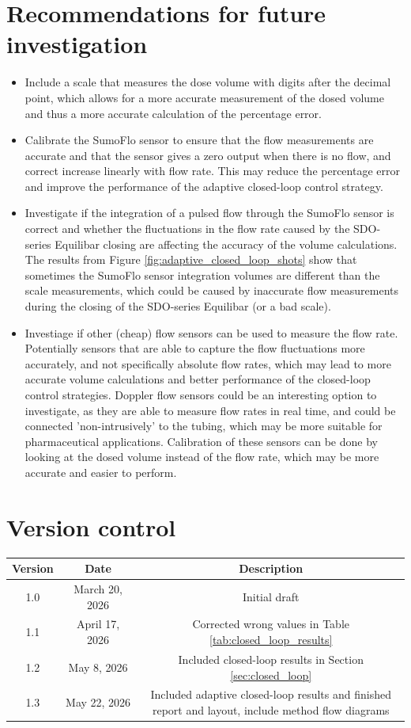 \documentclass[12pt,a4paper]{article}
\begin{document}
\section{Recommendations for future investigation}
\label{sec:recommendations}
\begin{itemize}
    \item Include a scale that measures the dose volume with digits after the decimal point, which allows for a more accurate measurement of the dosed volume and thus a more accurate calculation of the percentage error.
    \item Calibrate the SumoFlo sensor to ensure that the flow measurements are accurate and that the sensor gives a zero output when there is no flow, and correct increase linearly with flow rate. This may reduce the percentage error and improve the performance of the adaptive closed-loop control strategy.
    \item Investigate if the integration of a pulsed flow through the SumoFlo sensor is correct and whether the fluctuations in the flow rate caused by the SDO-series Equilibar closing are affecting the accuracy of the volume calculations. The results from Figure \ref{fig:adaptive_closed_loop_shots} show that sometimes the SumoFlo sensor integration volumes are different than the scale measurements, which could be caused by inaccurate flow measurements during the closing of the SDO-series Equilibar (or a bad scale).
    \item Investiage if other (cheap) flow sensors can be used to measure the flow rate. Potentially sensors that are able to capture the flow fluctuations more accurately, and not specifically absolute flow rates, which may lead to more accurate volume calculations and better performance of the closed-loop control strategies. Doppler flow sensors could be an interesting option to investigate, as they are able to measure flow rates in real time, and could be connected 'non-intrusively' to the tubing, which may be more suitable for pharmaceutical applications. Calibration of these sensors can be done by looking at the dosed volume instead of the flow rate, which may be more accurate and easier to perform.
\end{itemize}

\newpage
\section*{Version control}

\begin{tabular}{|c|c|c|}
\hline
Version & Date & Description \\
\hline
1.0 & March 20, 2026 & Initial draft \\
\hline
1.1 & April 17, 2026 & Corrected wrong values in Table \ref{tab:closed_loop_results} \\
\hline 
1.2 & May 8, 2026 & Included closed-loop results in Section \ref{sec:closed_loop} \\
\hline
1.3 & May 22, 2026 & \makecell{Included adaptive closed-loop results and finished\\report and layout, include method flow diagrams} \\
\hline
\end{tabular}
\end{document}
